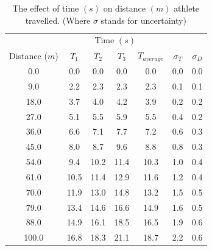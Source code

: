 \documentclass[index]{subfiles}
\begin{document}
\begin{table}[H]
    \centering
    \caption{The effect of time \((s)\) on distance \((m)\) athlete travelled. (Where \(\sigma\) stands for uncertainty)}
    \begin{tabular}{@{}ccccccc@{}} \toprule
                         & \multicolumn{4}{c}{Time \((s)\)}                                                                         \\ \cmidrule(r){2-5}
        Distance (\(m\)) & \(T_1\)                          & \(T_2\) & \(T_3\) & \(T_{average}\) & \(\sigma_{T}\) & \(\sigma_{D}\) \\ \midrule
        0.0              & 0.0                              & 0.0     & 0.0     & 0.0             & 0.0            & 0.0            \\
        9.0              & 2.2                              & 2.3     & 2.3     & 2.3             & 0.1            & 0.1            \\
        18.0             & 3.7                              & 4.0     & 4.2     & 3.9             & 0.2            & 0.2            \\
        27.0             & 5.1                              & 5.5     & 5.9     & 5.5             & 0.4            & 0.2            \\
        36.0             & 6.6                              & 7.1     & 7.7     & 7.2             & 0.6            & 0.3            \\
        45.0             & 8.0                              & 8.7     & 9.6     & 8.8             & 0.8            & 0.3            \\
        54.0             & 9.4                              & 10.2    & 11.4    & 10.3            & 1.0            & 0.4            \\
        61.0             & 10.5                             & 11.4    & 12.9    & 11.6            & 1.2            & 0.4            \\
        70.0             & 11.9                             & 13.0    & 14.8    & 13.2            & 1.5            & 0.5            \\
        79.0             & 13.4                             & 14.6    & 16.6    & 14.9            & 1.6            & 0.5            \\
        88.0             & 14.9                             & 16.1    & 18.5    & 16.5            & 1.9            & 0.6            \\
        100.0            & 16.8                             & 18.3    & 21.1    & 18.7            & 2.2            & 0.6            \\

\end{tabular}
\end{table}
\end{document}
